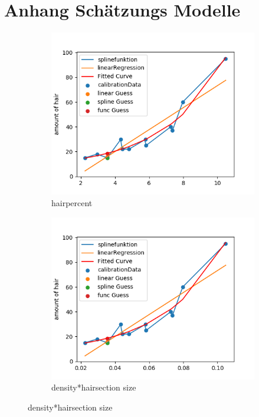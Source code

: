 \documentclass[german,a4paper, 12pt]{scrartcl}
\begin{document}
\section{Anhang Schätzungs Modelle}
\label{appendix:modelle}
\begin{figure}[H] %
\begin{subfigure}{0.48\textwidth}
	\includegraphics[width=1.1\linewidth]{fig64/g01_hairpercent.png}
	\caption{hairpercent} \label{fig:a}
\end{subfigure}\hspace*{\fill}
\begin{subfigure}{0.48\textwidth}
	\includegraphics[width=1.1\linewidth]{fig64/g02_densitynorm.png}
	\caption{density*hairsection size} \label{fig:b}
\end{subfigure}


\end{figure}
\end{document}

